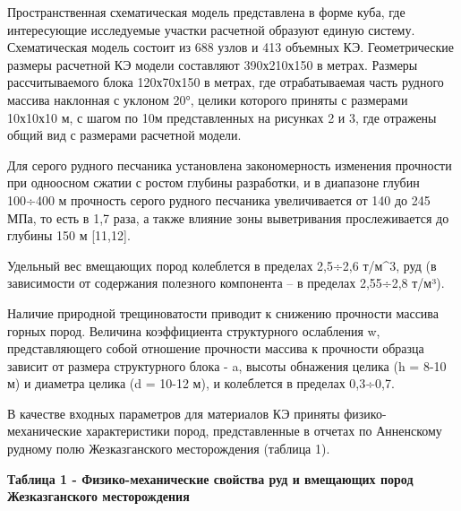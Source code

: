 Пространственная схематическая модель представлена в форме куба, где
интересующие исследуемые участки расчетной образуют единую систему.
Схематическая модель состоит из 688 узлов и 413 объемных КЭ.
Геометрические размеры расчетной КЭ модели составляют 390х210х150 в
метрах. Размеры рассчитываемого блока 120х70х150 в метрах, где
отрабатываемая часть рудного массива наклонная с уклоном 20°, целики
которого приняты с размерами 10х10х10 м, с шагом по 10м представленных
на рисунках 2 и 3, где отражены общий вид с размерами расчетной модели.

Для серого рудного песчаника установлена закономерность изменения
прочности при одноосном сжатии с ростом глубины разработки, и в
диапазоне глубин 100÷400 м прочность серого рудного песчаника
увеличивается от 140 до 245 МПа, то есть в 1,7 раза, а также влияние
зоны выветривания прослеживается до глубины 150 м {[}11,12{]}.

Удельный вес вмещающих пород колеблется в пределах 2,5÷2,6 т/м\^{}3, руд
(в зависимости от содержания полезного компонента -- в пределах 2,55÷2,8
т/м³).

Наличие природной трещиноватости приводит к снижению прочности массива
горных пород. Величина коэффициента структурного ослабления w,
представляющего собой отношение прочности массива к прочности образца
зависит от размера структурного блока - a, высоты обнажения целика (h =
8-10 м) и диаметра целика (d = 10-12 м), и колеблется в пределах
0,3÷0,7.

В качестве входных параметров для материалов КЭ приняты
физико-механические характеристики пород, представленные в отчетах по
Анненскому рудному полю Жезказганского месторождения (таблица 1).

{\bfseries Таблица 1 - Физико-механические свойства руд и вмещающих пород Жезказганского месторождения}

